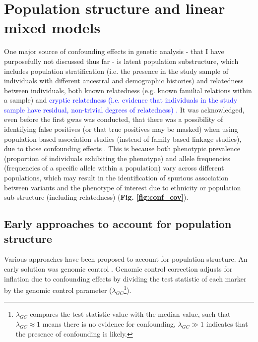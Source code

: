 \section{Population structure and linear mixed models}
\label{sec:linear_mixed_models}

One major source of confounding effects in genetic analysis - that I have purposefully not discussed thus far -  is latent population substructure, which includes population stratification (i.e. the presence in the study sample of individuals with different ancestral and demographic histories) and relatedness between individuals, both known relatedness (e.g. known familial relations within a sample) and \textcolor{blue}{cryptic relatedness (i.e. evidence that individuals in the study sample have residual, non-trivial degrees of relatedness) \cite{mccarthy2008genome}.}
It was acknowledged, even before the first \gls{gwas} was conducted, that there was a possibility of identifying false positives (or that true positives may be masked) when using population based association studies (instead of family based linkage studies), due to those confounding effects \cite{burton2005key}. 
This is because both phenotypic prevalence (proportion of individuals exhibiting the phenotype) and allele frequencies (frequencies of a specific allele within a population) vary across different populations, which may result in the identification of spurious association between variants and the phenotype of interest due to ethnicity or population sub-structure (including relatedness) \cite{burton2005key} (\textbf{Fig. \ref{fig:conf_cov}}).


\subsection{Early approaches to account for population structure}
\label{sec:pop_struct_noLMM}

Various approaches have been proposed to account for population structure.
An early solution was genomic control \cite{devlin1999genomic}.
Genomic control correction adjusts for inflation due to confounding effects by dividing the test statistic of each marker by the genomic control parameter ($\lambda_{GC}$\footnote{$\lambda_{GC}$ compares the test-statistic value with the median value, such that $\lambda_{GC} \approx 1$ means there is no evidence for confounding, $\lambda_{GC} \gg 1$ indicates that the presence of confounding is likely.}). \\

